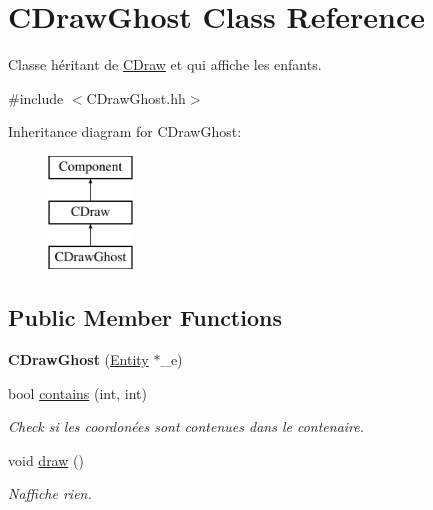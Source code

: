 \hypertarget{class_c_draw_ghost}{}\section{C\+Draw\+Ghost Class Reference}
\label{class_c_draw_ghost}


Classe héritant de \hyperlink{class_c_draw}{C\+Draw} et qui affiche les enfants.  




{\ttfamily \#include $<$C\+Draw\+Ghost.\+hh$>$}

Inheritance diagram for C\+Draw\+Ghost\+:\begin{figure}[H]
\begin{center}
\leavevmode
\includegraphics[height=3.000000cm]{class_c_draw_ghost}
\end{center}
\end{figure}
\subsection*{Public Member Functions}
\begin{DoxyCompactItemize}
\item 
\hypertarget{class_c_draw_ghost_a173685c29ad642d905a2b8ffccf03bc6}{}{\bfseries C\+Draw\+Ghost} (\hyperlink{class_entity}{Entity} $\ast$\+\_\+e)\label{class_c_draw_ghost_a173685c29ad642d905a2b8ffccf03bc6}

\item 
bool \hyperlink{class_c_draw_ghost_ae1fbbc9c042292112706fa399e249b35}{contains} (int, int)
\begin{DoxyCompactList}\small\item\em Check si les coordonées sont contenues dans le contenaire. \end{DoxyCompactList}\item 
\hypertarget{class_c_draw_ghost_a4d50d57e38f8eba07c9ba48540e7838c}{}void \hyperlink{class_c_draw_ghost_a4d50d57e38f8eba07c9ba48540e7838c}{draw} ()\label{class_c_draw_ghost_a4d50d57e38f8eba07c9ba48540e7838c}

\begin{DoxyCompactList}\small\item\em N\textquotesingle{}affiche rien. \end{DoxyCompactList}\end{DoxyCompactItemize}
